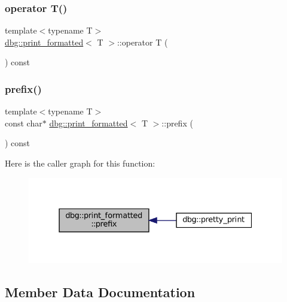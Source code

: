\subsubsection{\texorpdfstring{operator T()}{operator T()}}
{\footnotesize\ttfamily template$<$typename T$>$ \\
\hyperlink{structdbg_1_1print__formatted}{dbg\+::print\+\_\+formatted}$<$ T $>$\+::operator T (\begin{DoxyParamCaption}{ }\end{DoxyParamCaption}) const\hspace{0.3cm}{\ttfamily [inline]}}

\mbox{\label{structdbg_1_1print__formatted_ab490d37d984d053177b6af3f94d0136e}} 
\subsubsection{\texorpdfstring{prefix()}{prefix()}}
{\footnotesize\ttfamily template$<$typename T$>$ \\
const char$\ast$ \hyperlink{structdbg_1_1print__formatted}{dbg\+::print\+\_\+formatted}$<$ T $>$\+::prefix (\begin{DoxyParamCaption}{ }\end{DoxyParamCaption}) const\hspace{0.3cm}{\ttfamily [inline]}}

Here is the caller graph for this function\+:
\nopagebreak
\begin{figure}[H]
\begin{center}
\leavevmode
\includegraphics[width=331pt]{structdbg_1_1print__formatted_ab490d37d984d053177b6af3f94d0136e_icgraph}
\end{center}
\end{figure}


\subsection{Member Data Documentation}
\mbox{\label{structdbg_1_1print__formatted_af57ecb89743fca9b4cb1d0afd3c9d9f4}} 

